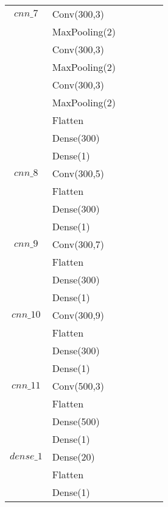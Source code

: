 \begin{longtable}{| c | m{0.58\linewidth} | r | m{0.1\linewidth} |}
    $cnn\_7$    & Conv(300,3)               \\
                & MaxPooling(2)             \\
                & Conv(300,3)               \\
                & MaxPooling(2)             \\
                & Conv(300,3)               \\
                & MaxPooling(2)             \\
                & Flatten                   \\
                & Dense(300)                \\
                & Dense(1)                  \\ \hline
    $cnn\_8$    & Conv(300,5)               \\
                & Flatten                   \\
                & Dense(300)                \\
                & Dense(1)                  \\ \hline
    $cnn\_9$    & Conv(300,7)               \\
                & Flatten                   \\
                & Dense(300)                \\
                & Dense(1)                  \\ \hline
    $cnn\_10$   & Conv(300,9)               \\
                & Flatten                   \\
                & Dense(300)                \\
                & Dense(1)                  \\ \hline


    $cnn\_11$   & Conv(500,3)               \\
                & Flatten                   \\
                & Dense(500)                \\
                & Dense(1)                  \\ \hline


    $dense\_1$  & Dense(20)                 \\
                & Flatten                   \\
                & Dense(1)                  \\ \hline


\end{longtable}
